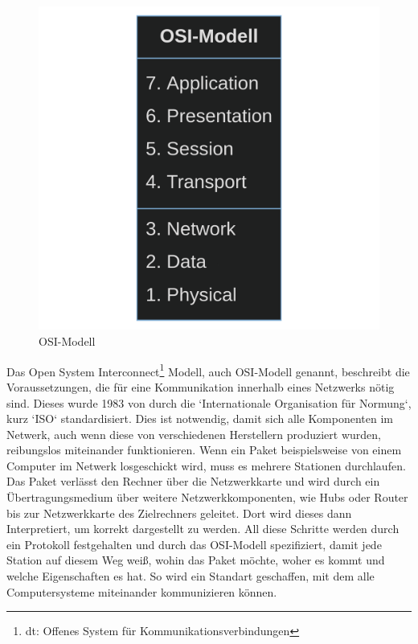 \documentclass[12pt]{article}
\begin{document}
\begin{figure}
	\centering
	\includegraphics[scale=0.1]{Bilder/OSI-Modell}
	\caption{OSI-Modell}
	\label{fig:figure3}
	
\end{figure}

	Das Open System Interconnect\footnote{dt: Offenes System für Kommunikationsverbindungen} Modell, auch OSI-Modell genannt, beschreibt die Voraussetzungen, die für eine Kommunikation innerhalb eines Netzwerks nötig sind. Dieses wurde 1983 von durch die `Internationale Organisation für Normung`, kurz `ISO` standardisiert. Dies ist notwendig, damit sich alle Komponenten im Netwerk, auch wenn diese von verschiedenen Herstellern produziert wurden, reibungslos miteinander funktionieren. Wenn ein Paket beispielsweise von einem Computer im Netwerk losgeschickt wird, muss es mehrere Stationen durchlaufen. Das Paket verlässt den Rechner über die Netzwerkkarte und wird durch ein Übertragungsmedium über weitere Netzwerkkomponenten, wie Hubs oder Router bis zur Netzwerkkarte des Zielrechners geleitet. Dort wird dieses dann Interpretiert, um korrekt dargestellt zu werden. All diese Schritte werden durch ein Protokoll festgehalten und durch das OSI-Modell spezifiziert, damit jede Station auf diesem Weg weiß, wohin das Paket möchte, woher es kommt und welche Eigenschaften es hat. So wird ein Standart geschaffen, mit dem alle Computersysteme miteinander kommunizieren können.
	
\end{document}
